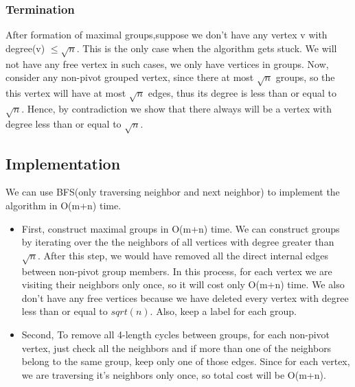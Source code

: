 \documentclass{article}
\begin{document}
\subsubsection{Termination}
After formation of maximal groups,suppose we don't have any vertex v with degree(v) $\leq \sqrt{n}$. This is the only case when the algorithm gets stuck. We will not have any free vertex in such cases, we only have vertices in groups. Now, consider any non-pivot grouped vertex, since there at most $\sqrt{n}$ groups, so the this vertex will have at most $\sqrt{n}$ edges, thus its degree is less than or equal to $\sqrt{n}$.  Hence, by contradiction we show that there always will be a vertex with degree less than or equal to $\sqrt{n}$.

\subsection{Implementation}
We can use BFS(only traversing neighbor and next neighbor) to implement the algorithm in O(m+n) time. \\

\begin{itemize}
\item First, construct maximal groups in O(m+n) time. We can construct groups by iterating over the the neighbors of all vertices with degree greater than $\sqrt{n}$. After this step, we would have removed all the direct internal edges between non-pivot group members. In this process, for each vertex we are visiting their neighbors only once, so it will cost only O(m+n) time.  We also don't have any free vertices because we have deleted every vertex with degree less than or equal to $sqrt(n)$. Also, keep a label for each group.  
\item Second, To remove all 4-length cycles between groups, for each non-pivot vertex, just check all the neighbors and if more than one of the neighbors belong to the same group, keep only one of those edges. Since for each vertex, we are traversing it's neighbors only once, so total cost will be O(m+n).
\end{itemize} 
\end{document}
